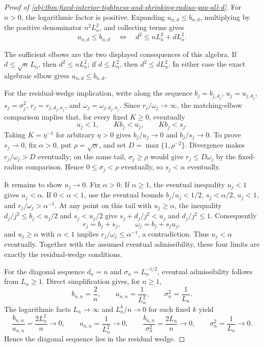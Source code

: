 \documentclass[11pt]{article}
\begin{document}
\begin{proof}[Proof of \cref{obj:thm:fixed-interior-tightness-and-shrinking-radius-gap-all-d}]
For \(n>0\), the logarithmic factor is positive.  Expanding \(u_{n,d}\le b_{n,d}\), multiplying by the positive denominator \(n^2L_n^2\), and collecting terms gives
\[
u_{n,d}\le b_{n,d}
\quad\Longleftrightarrow\quad
d^2\le nL_n^2+dL_n^2 .
\]

The sufficient elbows are the two displayed consequences of this algebra.  If \(d\le\sqrt n\,L_n\), then \(d^2\le nL_n^2\); if \(d\le L_n^2\), then \(d^2\le dL_n^2\).  In either case the exact algebraic elbow gives \(u_{n,d}\le b_{n,d}\).

For the residual-wedge implication, write along the sequence \(b_j=b_{j,d_j}\), \(u_j=u_{j,d_j}\), \(s_j=\sigma_j^2\), \(r_j=r_{j,d_j,\sigma_j}\), and \(\omega_j=\omega_{j,d_j,\sigma_j}\).  Since \(r_j/\omega_j\to\infty\), the matching-elbow comparison implies that, for every fixed \(K\ge0\), eventually
\[
u_j<1,\qquad Kb_j<u_j,\qquad Kb_j<s_j.
\]
Taking \(K=\eta^{-1}\) for arbitrary \(\eta>0\) gives \(b_j/u_j\to0\) and \(b_j/s_j\to0\).  To prove \(s_j\to0\), fix \(\alpha>0\), put \(\rho=\sqrt\alpha\), and set \(D=\max\{1,\rho^{-2}\}\).  Divergence makes \(r_j/\omega_j>D\) eventually; on the same tail, \(\sigma_j\ge\rho\) would give \(r_j\le D\omega_j\) by the fixed-radius comparison.  Hence \(0\le\sigma_j<\rho\) eventually, so \(s_j<\alpha\) eventually.

It remains to show \(u_j\to0\).  Fix \(\alpha>0\).  If \(\alpha\ge1\), the eventual inequality \(u_j<1\) gives \(u_j<\alpha\).  If \(0<\alpha<1\), use the eventual bounds \(b_j/u_j<1/2\), \(s_j<\alpha/2\), \(u_j<1\), and \(r_j/\omega_j>\alpha^{-1}\).  At any point on this tail with \(u_j\ge\alpha\), the inequality \(d_j/j^2\le b_j<u_j/2\) and \(s_j<u_j/2\) give \(s_j+d_j/j^2<u_j\) and \(d_j/j^2\le1\).  Consequently
\[
r_j=b_j+s_j,\qquad \omega_j=b_j+s_ju_j,
\]
and \(u_j\ge\alpha\) with \(\alpha<1\) implies \(r_j/\omega_j\le\alpha^{-1}\), a contradiction.  Thus \(u_j<\alpha\) eventually.  Together with the assumed eventual admissibility, these four limits are exactly the residual-wedge conditions.

For the diagonal sequence \(d_n=n\) and \(\sigma_n=L_n^{-1/2}\), eventual admissibility follows from \(L_n\ge1\).  Direct simplification gives, for \(n\ge1\),
\[
b_{n,n}=\frac2n,\qquad
u_{n,n}=\frac1{L_n^2},\qquad
\sigma_n^2=\frac1{L_n}.
\]
The logarithmic facts \(L_n\to\infty\) and \(L_n^k/n\to0\) for each fixed \(k\) yield
\[
\frac{b_{n,n}}{u_{n,n}}=\frac{2L_n^2}{n}\to0,\qquad
u_{n,n}=\frac1{L_n^2}\to0,\qquad
\frac{b_{n,n}}{\sigma_n^2}=\frac{2L_n}{n}\to0,\qquad
\sigma_n^2=\frac1{L_n}\to0.
\]
Hence the diagonal sequence lies in the residual wedge.


\end{proof}
\end{document}
